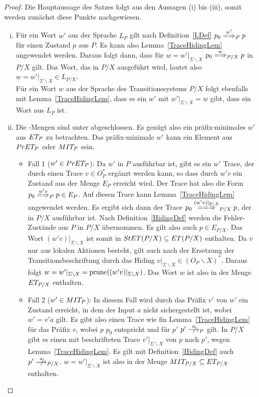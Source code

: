\begin{proof}
  Die Hauptaussage des Satzes folgt aus den Aussagen (i) bis (iii), somit
  werden zunächst diese Punkte nachgewiesen.
  \begin{enumerate}[(i)]
    \item Für ein Wort $w'$ aus der Sprache $L_P$ gilt nach
      Definition~\ref{LDef} $p_0 \weakmay[w']_P p$ für einen Zustand $p$ aus
      $P$. Es kann also Lemma~\ref{TraceHidingLem} angewendet werden. Daraus
      folgt dann, dass für $w=w'|_{\Sigma\backslash X}$ $p_0 \weakmay[w]_{P/X}
      p$ in $P/X$ gilt. Das Wort, das in $P/X$ ausgeführt wird, lautet also
      $w=w'|_{\Sigma\backslash X}\in L_{P/X}$.\\
      Für ein Wort $w$ aus der Sprache des Transitionssystems $P/X$ folgt
      ebenfalls mit Lemma~\ref{TraceHidingLem}, dass es ein $w'$ mit
      $w'|_{\Sigma\backslash X} = w$ gibt, dass ein Wort aus $L_P$ ist.
    \item Die \ET{}-Mengen sind unter \cont{} abgeschlossen. Es genügt also ein
      präfix-minimales $w'$ aus $ET _{P}$ zu betrachten. Das präfix-minimale
      $w'$ kann ein Element aus $PrET _P$ oder $MIT _P$ sein.
      \begin{itemize}
        \item Fall 1 ($w'\in PrET _P$): Da $w'$ in $P$ ausführbar ist, gibt es
          ein $w'$ Trace, der durch einen Trace $v \in O_P^*$ ergänzt werden
          kann, so dass durch $w'v$ ein Zustand aus der Menge $E_P$ erreicht
          wird. Der Trace hat also die Form $p_0 \weakmay[w'v]_P p\in E_P$. Auf
          diesen Trace kann Lemma~\ref{TraceHidingLem} angewendet werden. Es
          ergibt sich dann der Trace $p_0 \lweakmay[(w'v)|_{\Sigma\backslash
          X}]_{P/X} p$, der in $P/X$ ausführbar ist. Nach
          Definition~\ref{HidingDef} werden die Fehler-Zustände aus $P$ in
          $P/X$ übernommen. Es gilt also auch $p\in E_{P/X}$. Das Wort
          $(w'v)|_{\Sigma\backslash X}$ ist somit in $StET (P/X) \subseteq ET
          (P/X)$ enthalten. Da $v$ nur aus lokalen Aktionen besteht, gilt auch
          nach der Ersetzung der Transitionsbeschriftung durch das Hiding
          $v|_{\Sigma\backslash X}\in (O_P\backslash X)^*$. Daraus folgt $w =
          w'|_{\Sigma\backslash X} = \mathrm{prune} ((w'v)|_{\Sigma\backslash X})$.
          Das Wort $w$ ist also in der Menge $ET _{P/X}$ enthalten.
        \item Fall 2 ($w'\in MIT _P$): In diesem Fall wird durch das Präfix
          $v'$ von $w'$ ein Zustand erreicht, in dem der Input $a$ nicht
          sichergestellt ist, wobei $w'=v'a$ gilt. Es gibt also einen Trace wie
          fin Lemma~\ref{TraceHidingLem} für das Präfix $v$, wobei $p$ $p_0$
          entspricht und für $p'$ $p'\nmust[a]_P$ gilt. In $P/X$ gibt es einen
          mit beschrifteten Trace $v'|_{\Sigma\backslash X}$ von $p$ nach $p'$,
          wegen Lemma~\ref{TraceHidingLem}. Es gilt mit
          Definition~\ref{HidingDef} auch $p'\nmust[a]_{P/X}$. $w =
          w'|_{\Sigma\backslash X}$ ist also in der Menge $MIT _{P/X}
          \subseteq ET _{P/X}$ enthalten.
      \end{itemize}


\end{enumerate}
\end{proof}
